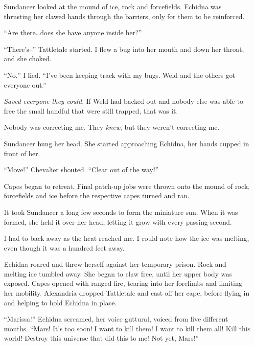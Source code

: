 Sundancer looked at the mound of ice, rock and forcefields.  Echidna was thrusting her clawed hands through the barriers, only for them to be reinforced.



``Are there\ldots does she have anyone inside her?''



``There's--'' Tattletale started.  I flew a bug into her mouth and down her throat, and she choked.



``No,'' I lied.  ``I've been keeping track with my bugs.  Weld and the others got everyone out.''



\emph{Saved everyone they could.  }If Weld had backed out and nobody else was able to free the small handful that were still trapped, that was it.



Nobody was correcting me.  They \emph{knew}, but they weren't correcting me.



Sundancer hung her head.  She started approaching Echidna, her hands cupped in front of her.



``Move!''  Chevalier shouted.  ``Clear out of the way!''



Capes began to retreat.  Final patch-up jobs were thrown onto the mound of rock, forcefields and ice before the respective capes turned and ran.



It took Sundancer a long few seconds to form the miniature sun.  When it was formed, she held it over her head, letting it grow with every passing second.



I had to back away as the heat reached me.  I could note how the ice was melting, even though it was a hundred feet away.



Echidna roared and threw herself against her temporary prison.  Rock and melting ice tumbled away.  She began to claw free, until her upper body was exposed.  Capes opened with ranged fire, tearing into her forelimbs and limiting her mobility.  Alexandria dropped Tattletale and cast off her cape, before flying in and helping to hold Echidna in place.



``Marissa!''  Echidna screamed, her voice guttural, voiced from five different mouths.  ``Mars!  It's too soon!  I want to kill them!  I want to kill them all!  Kill this world!  Destroy this universe that did this to me!  Not yet, Mars!''



